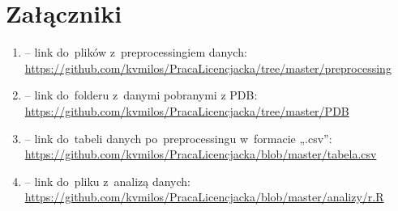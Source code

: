 \documentclass[licencjacka]{pracamgr_Kogni}
\begin{document}
    \chapter*{Załączniki}

    \begin{enumerate}
        \item{ -- link do~plików z~preprocessingiem danych: \url{https://github.com/kvmilos/PracaLicencjacka/tree/master/preprocessing}
            \label {zal:a}}
        \item{ -- link do~folderu z~danymi pobranymi z PDB: \url{https://github.com/kvmilos/PracaLicencjacka/tree/master/PDB}
            \label {zal:b}}
        \item{ -- link do~tabeli danych po~preprocessingu w~formacie „.csv”: \url{https://github.com/kvmilos/PracaLicencjacka/blob/master/tabela.csv}
            \label {zal:c}}
        \item{ -- link do~pliku z~analizą danych: \url{https://github.com/kvmilos/PracaLicencjacka/blob/master/analizy/r.R}
            \label {zal:d}}
    \end{enumerate}
\end{document}
